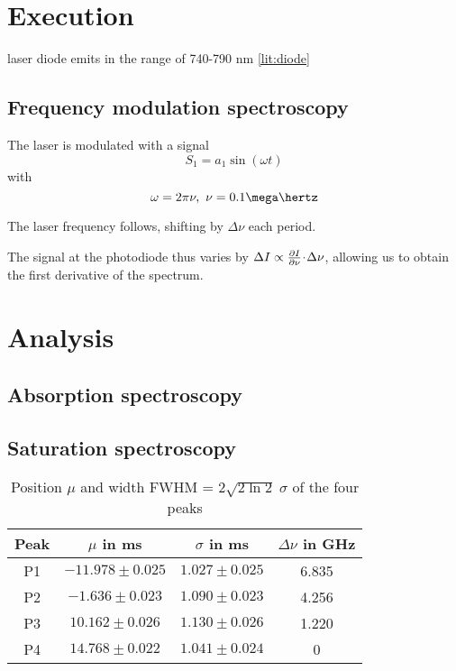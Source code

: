 
\section{Execution} %

laser diode emits in the range of 740-790 nm \ref{lit:diode}

\subsection{Frequency modulation spectroscopy}
The laser is modulated with a signal
\begin{equation}
 S_1 = a_1 \sin(\omega t)
\end{equation}
with
\begin{equation}
 \omega = 2 \pi \nu,~ \nu = 0.1 \mega\hertz
\end{equation}

The laser frequency follows, shifting by $\Delta \nu$ each period.

The signal at the photodiode thus varies by $\Delta I \propto \frac{\partial I}{\partial\nu} \!\cdot\! \Delta \nu$, allowing us to obtain the first derivative of the spectrum. 


\section{Analysis}
\subsection{Absorption spectroscopy}


\subsection{Saturation spectroscopy}


\begin{table}[h]
 \centering
 \caption{Position $\mu$ and width FWHM = $2 \sqrt{2 \ln 2} \; \sigma$ of the four peaks}
 \label{tab:raw}
 \begin{tabular}{cccc}
  \toprule
  Peak	& $\mu$ in ms 		& $\sigma$ in ms 		& $\Delta \nu$ in GHz	\\
  \midrule
  P1	& $-11.978 \pm 0.025$	& $1.027 \pm 0.025$ 	& 6.835		\\
  P2	& $-1.636 \pm 0.023$	& $1.090 \pm 0.023$ 	& 4.256		\\
  P3	& $10.162 \pm 0.026$	& $1.130 \pm 0.026$ 	& 1.220		\\
  P4	& $14.768 \pm 0.022$	& $1.041 \pm 0.024$ 	& 0			\\
  \bottomrule
 \end{tabular}
\end{table}

